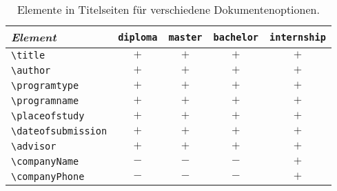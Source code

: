 
\begin{table}
	\caption{Elemente in Titelseiten für verschiedene Dokumentenoptionen.}
	\label{tab:TitelElemente}
	\centering\small
	\begin{tabular}{lcccc}
		\toprule
		\emph{Element} & \texttt{diploma} & \texttt{master} & \texttt{bachelor} & \texttt{internship} \\
		\midrule
		\verb!\title! 			& $+$ & $+$ & $+$ & $+$ \\
		\verb!\author! 			& $+$ & $+$ & $+$ & $+$ \\
		\verb!\programtype! & $+$ & $+$ & $+$ & $+$ \\
		\verb!\programname! & $+$ & $+$ & $+$ & $+$ \\
		\verb!\placeofstudy! 	& $+$ & $+$ & $+$ & $+$ \\
		\verb!\dateofsubmission! 	& $+$ & $+$ & $+$ & $+$ \\
		\verb!\advisor! 		& $+$ & $+$ & $+$ & $+$ \\
		\verb!\companyName! 			& $-$ & $-$ & $-$ & $+$ \\
		\verb!\companyPhone! 	& $-$ & $-$ & $-$ & $+$ \\
		\bottomrule
	\end{tabular}
\end{table}



